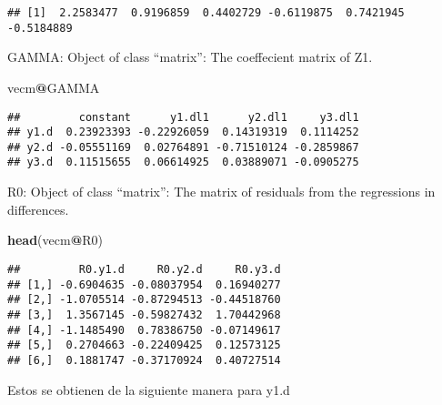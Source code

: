 \documentclass[]{book}
\newenvironment{Shaded}{\begin{snugshade}}{\end{snugshade}}
\newcommand{\KeywordTok}[1]{\textcolor[rgb]{0.13,0.29,0.53}{\textbf{#1}}}
\newcommand{\DecValTok}[1]{\textcolor[rgb]{0.00,0.00,0.81}{#1}}
\newcommand{\StringTok}[1]{\textcolor[rgb]{0.31,0.60,0.02}{#1}}
\newcommand{\OperatorTok}[1]{\textcolor[rgb]{0.81,0.36,0.00}{\textbf{#1}}}
\newcommand{\NormalTok}[1]{#1}
\theoremstyle{definition}
\theoremstyle{definition}
\theoremstyle{definition}
\theoremstyle{remark}
\begin{document}
\begin{verbatim}
## [1]  2.2583477  0.9196859  0.4402729 -0.6119875  0.7421945 -0.5184889
\end{verbatim}

GAMMA: Object of class ``matrix'': The coeffecient matrix of Z1.

\begin{Shaded}
\begin{Highlighting}[]
\NormalTok{vecm}\OperatorTok{@}\NormalTok{GAMMA}
\end{Highlighting}
\end{Shaded}

\begin{verbatim}
##         constant      y1.dl1      y2.dl1     y3.dl1
## y1.d  0.23923393 -0.22926059  0.14319319  0.1114252
## y2.d -0.05551169  0.02764891 -0.71510124 -0.2859867
## y3.d  0.11515655  0.06614925  0.03889071 -0.0905275
\end{verbatim}

R0: Object of class ``matrix'': The matrix of residuals from the
regressions in differences.

\begin{Shaded}
\begin{Highlighting}[]
\KeywordTok{head}\NormalTok{(vecm}\OperatorTok{@}\NormalTok{R0)}
\end{Highlighting}
\end{Shaded}

\begin{verbatim}
##         R0.y1.d     R0.y2.d     R0.y3.d
## [1,] -0.6904635 -0.08037954  0.16940277
## [2,] -1.0705514 -0.87294513 -0.44518760
## [3,]  1.3567145 -0.59827432  1.70442968
## [4,] -1.1485490  0.78386750 -0.07149617
## [5,]  0.2704663 -0.22409425  0.12573125
## [6,]  0.1881747 -0.37170924  0.40727514
\end{verbatim}

Estos se obtienen de la siguiente manera para y1.d

\begin{Shaded}
\end{Shaded}
\end{document}
